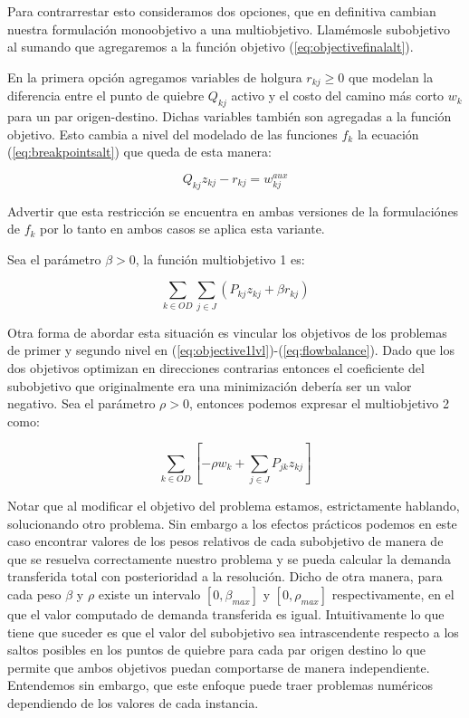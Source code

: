 \documentclass{article}
\begin{document}
  Para contrarrestar esto consideramos dos opciones, que en definitiva cambian nuestra formulación monoobjetivo a una multiobjetivo. Llamémosle subobjetivo al sumando que agregaremos a la función objetivo (\ref{eq:objectivefinalalt}).

  En la primera opción agregamos variables de holgura $r_{kj} \geq 0$ que modelan la diferencia entre el punto de quiebre $Q_{kj}$ activo y el costo del camino más corto $w_k$ para un par origen-destino. Dichas variables también son agregadas a la función objetivo.
  Esto cambia a nivel del modelado de las funciones $f_k$ la ecuación (\ref{eq:breakpointsalt}) que queda de esta manera:

  \begin{equation}
    \label{eq:multipleobj1breakpoint}
    Q_{kj} z_{kj} - r_{kj} = w^{aux}_{kj}
  \end{equation}

  Advertir que esta restricción se encuentra en ambas versiones de la formulaciónes de $f_k$ por lo tanto en ambos casos se aplica esta variante.

  Sea el parámetro $\beta > 0$, la función multiobjetivo 1 es:

  \begin{equation}
    \label{eq:multipleobj1}
    \sum_{k \in OD} \sum_{j \in J} \left( P_{kj}z_{kj} + \beta r_{kj} \right)
  \end{equation}

  Otra forma de abordar esta situación es vincular los objetivos de los problemas de primer y segundo nivel en (\ref{eq:objective1lvl})-(\ref{eq:flowbalance}). Dado que los dos objetivos optimizan en direcciones contrarias entonces el coeficiente del subobjetivo que originalmente era una minimización debería ser un valor negativo. Sea el parámetro $\rho > 0$, entonces podemos expresar el multiobjetivo 2 como:

  \begin{equation}
    \label{eq:multipleobj2}
    \sum_{k \in OD} \left[ -\rho w_k + \sum_{j \in J} P_{jk}z_{kj} \right]
  \end{equation}

  Notar que al modificar el objetivo del problema estamos, estrictamente hablando, solucionando otro problema. Sin embargo a los efectos prácticos podemos en este caso encontrar valores de los pesos relativos de cada subobjetivo de manera de que se resuelva correctamente nuestro problema y se pueda calcular la demanda transferida total con posterioridad a la resolución. Dicho de otra manera, para cada peso $\beta$ y $\rho$ existe un intervalo $[0, \beta_{max}]$ y $[0, \rho_{max}]$ respectivamente, en el que el valor computado de demanda transferida es igual. Intuitivamente lo que tiene que suceder es que el valor del subobjetivo sea intrascendente respecto a los saltos posibles en los puntos de quiebre para cada par origen destino lo que permite que ambos objetivos puedan comportarse de manera independiente. Entendemos sin embargo, que este enfoque puede traer problemas numéricos dependiendo de los valores de cada instancia.
\end{document}

